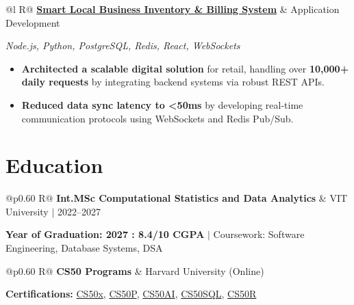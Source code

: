 \documentclass[a4paper,11pt]{article}
\newcommand{\subheading}[1]{\textbf{#1}}
\newcommand{\meta}[1]{{\fontsize{10}{12}\selectfont\textcolor[HTML]{3A3A3A}{#1}}}
\newcommand{\techstack}[1]{{\fontsize{10}{12}\selectfont\textcolor[HTML]{1A1A1A}{\textit{#1}}}}
\newcommand{\ulink}[2]{\href{#1}{#2}}
\begin{document}
\begin{tabularx}{\linewidth}{@{}l R@{}}
\subheading{\ulink{https://github.com/su-jin1425/Smart-Local-Business-Inventory-Billing-System}{Smart Local Business Inventory \& Billing System}} & \meta{Application Development}
\end{tabularx}
\techstack{Node.js, Python, PostgreSQL, Redis, React, WebSockets}
\begin{itemize}[nosep, leftmargin=1.5em, itemsep=2pt, topsep=2pt]
  \item {\color[HTML]{0A0A0A}\fontsize{11}{14}\selectfont \textbf{Architected a scalable digital solution} for retail, handling over \textbf{10,000+ daily requests} by integrating backend systems via robust REST APIs.}
  \item {\color[HTML]{0A0A0A}\fontsize{11}{14}\selectfont \textbf{Reduced data sync latency to <50ms} by developing real-time communication protocols using WebSockets and Redis Pub/Sub.}
\end{itemize}

\section{Education}
\vspace{2pt}

\begin{tabularx}{\linewidth}{@{}p{0.60\linewidth} R@{}}
\subheading{Int.MSc Computational Statistics and Data Analytics} & \meta{VIT University $|$ 2022--2027}
\end{tabularx}
{\color[HTML]{3A3A3A}\fontsize{11}{14}\selectfont \textbf{Year of Graduation: 2027 : 8.4/10 CGPA} $|$ Coursework: Software Engineering, Database Systems, DSA}

\begin{tabularx}{\linewidth}{@{}p{0.60\linewidth} R@{}}
\subheading{CS50 Programs} & \meta{Harvard University (Online)}
\end{tabularx}
{\color[HTML]{3A3A3A}\fontsize{11}{14}\selectfont \textbf{Certifications:} \ulink{https://cs50.harvard.edu/certificates/b14b78df-e05c-413e-a607-1dd27303053a}{CS50x}, \ulink{https://cs50.harvard.edu/certificates/32477052-9db4-49c4-a5a4-d7e58429ca2c}{CS50P}, \ulink{https://cs50.harvard.edu/certificates/9cdb4d4a-1250-4f8e-9fd7-191864e0f919}{CS50AI}, \ulink{https://cs50.harvard.edu/certificates/bc486f24-f085-4e61-8536-80940b97a1b9}{CS50SQL}, \ulink{https://cs50.harvard.edu/certificates/666838e6-a053-4d82-b179-a60fe745fd84}{CS50R}}
\end{document}
